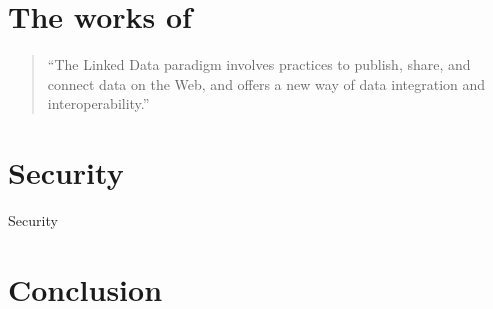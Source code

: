 \documentclass[]{report}
\begin{document}
% 
%

\section*{The works of }

\begin{quote}
``The Linked Data paradigm
involves practices to publish, share, and connect data on the
Web, and offers a new way of data integration and interoperability.''\cite{10}
\end{quote}



% 
%

\section{Security}
Security


% 
%


\section{Conclusion}


% 
%

\medskip
\end{document}
